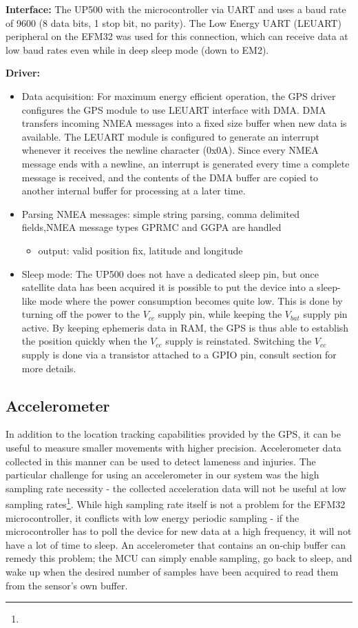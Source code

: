 \textbf{Interface:} The UP500 with the microcontroller via UART and uses a baud rate of 9600 (8 data bits, 1 stop bit, no parity). The Low Energy UART (LEUART) peripheral on the EFM32 was used for this connection, which can receive data at low baud rates even while in deep sleep mode (down to EM2).

\textbf{Driver:}
\begin{itemize}
\item{Data acquisition:}
For maximum energy efficient operation, the GPS driver configures the GPS module to use LEUART interface with DMA. DMA transfers incoming NMEA messages into a fixed size buffer when new data is available. The LEUART module is configured to generate an interrupt whenever it receives the newline character (0x0A). Since every NMEA message ends with a newline, an interrupt is generated every time a complete message is received, and the contents of the DMA buffer are copied to another internal buffer for processing at a later time.

\item{Parsing NMEA messages:} \TODO{} simple string parsing, comma delimited fields,NMEA message types GPRMC and GGPA are handled
\begin{itemize}
\item output: valid position fix, latitude and longitude
\end{itemize}

\item{Sleep mode:} The UP500 does not have a dedicated sleep pin, but once satellite data has been acquired it is possible to put the device into a sleep-like mode where the power consumption becomes quite low. This is done by turning off the power to the $V_{cc}$ supply pin, while keeping the $V_{bat}$ supply pin active. By keeping ephemeris data in RAM, the GPS is thus able to establish the position quickly when the $V_{cc}$ supply is reinstated. Switching the $V_{cc}$ supply is done via a transistor attached to a GPIO pin, consult section \TODO{} for more details.
\end{itemize}


\subsection{Accelerometer}
In addition to the location tracking capabilities provided by the GPS, it can be useful to measure smaller movements with higher precision. Accelerometer data collected in this manner can be used to detect lameness and injuries. The particular challenge for using an accelerometer in our system was the high sampling rate necessity - the collected acceleration data will not be useful at low sampling rates\footnote{}. While high sampling rate itself is not a problem for the EFM32 microcontroller, it conflicts with low energy periodic sampling - if the microcontroller has to poll the device for new data at a high frequency, it will not have a lot of time to sleep. An accelerometer that contains an on-chip buffer can remedy this problem; the MCU can simply enable sampling, go back to sleep, and wake up when the desired number of samples have been acquired to read them from the sensor’s own buffer.

